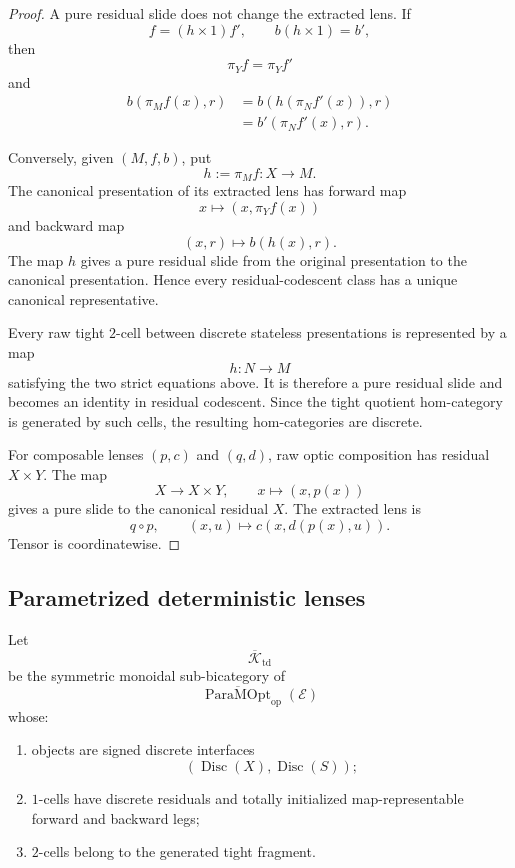 \begin{proof}
A pure residual slide does not change the extracted lens. If
\[
  f=(h\times1)f',
  \qquad
  b(h\times1)=b',
\]
then
\[
  \pi_Yf=\pi_Yf'
\]
and
\[
\begin{aligned}
  b(\pi_Mf(x),r)
  &=
  b(h(\pi_Nf'(x)),r)
  \\
  &=
  b'(\pi_Nf'(x),r).
\end{aligned}
\]

Conversely, given \((M,f,b)\), put
\[
  h:=\pi_Mf:X\to M.
\]
The canonical presentation of its extracted lens has forward map
\[
  x\longmapsto(x,\pi_Yf(x))
\]
and backward map
\[
  (x,r)\longmapsto b(h(x),r).
\]
The map \(h\) gives a pure residual slide from the original presentation to the canonical
presentation. Hence every residual-codescent class has a unique canonical representative.

Every raw tight \(2\)-cell between discrete stateless presentations is represented by a map
\[
  h:N\to M
\]
satisfying the two strict equations above. It is therefore a pure residual slide and becomes an
identity in residual codescent. Since the tight quotient hom-category is generated by such cells,
the resulting hom-categories are discrete.

For composable lenses \((p,c)\) and \((q,d)\), raw optic composition has residual \(X\times Y\).
The map
\[
  X\longrightarrow X\times Y,
  \qquad
  x\longmapsto(x,p(x))
\]
gives a pure slide to the canonical residual \(X\). The extracted lens is
\[
  q\circ p,
  \qquad
  (x,u)\longmapsto c(x,d(p(x),u)).
\]
Tensor is coordinatewise.
\end{proof}

\subsection{Parametrized deterministic lenses}

Let
\[
  \overline{\mathcal K}_{\mathrm{td}}
\]
be the symmetric monoidal sub-bicategory of
\[
  \overline{\operatorname{ParaMOpt}}_{\mathrm{op}}(\mathcal E)
\]
whose:
\begin{enumerate}
  \item objects are signed discrete interfaces
  \[
    (\operatorname{Disc}(X),\operatorname{Disc}(S));
  \]
  \item \(1\)-cells have discrete residuals and totally initialized map-representable forward and
  backward legs;
  \item \(2\)-cells belong to the generated tight fragment.
\end{enumerate}

